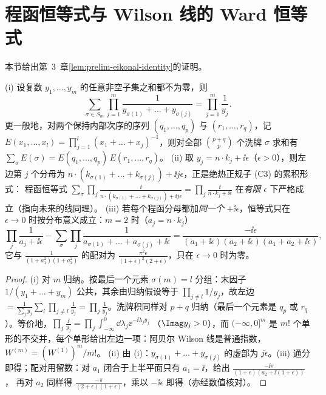 \section{程函恒等式与 Wilson 线的 Ward 恒等式}\label{sec:appB-eikonal}

本节给出第~3~章\cref{lem:prelim-eikonal-identity}的证明。

\begin{lemma}\label{lem:appB-shuffle}
(i) 设复数 $y_1,\dots,y_m$ 的任意非空子集之和都不为零，则
\begin{equation}\label{eq:appB-shuffle}
\sum_{\sigma\in S_m}\prod_{j=1}^m\frac{1}{y_{\sigma(1)}+\dots+y_{\sigma(j)}}=\prod_{j=1}^m\frac1{y_j}.
\end{equation}
更一般地，对两个保持内部次序的序列 $(q_1,\dots,q_p)$ 与 $(r_1,\dots,r_q)$，记 $E(x_1,\dots,x_l)=\prod_{j=1}^l(x_1+\dots+x_j)^{-1}$，则对全部 $\binom{p+q}{p}$ 个洗牌 $\sigma$ 求和有
$\sum_\sigma E(\sigma)=E(q_1,\dots,q_p)\,E(r_1,\dots,r_q)$。
(ii) 取 $y_j=n\cdot k_j+\ii\epsilon$（$\epsilon>0$），则左边第 $j$ 个分母为 $n\cdot(k_{\sigma(1)}+\dots+k_{\sigma(j)})+\ii j\epsilon$，正是绝热正规子 (C3) 的累积形式：
程函恒等式 $\sum_\sigma\prod_j\frac{\ii}{n\cdot(k_{\sigma(1)}+\dots+k_{\sigma(j)})+\ii j\epsilon}=\prod_j\frac{\ii}{n\cdot k_j+\ii\epsilon}$ 在\emph{有限} $\epsilon$ 下严格成立（指向未来的线同理）。
(iii) 若每个程函分母都加\emph{同一个} $+\ii\epsilon$，恒等式只在 $\epsilon\to0$ 时按分布意义成立：$m=2$ 时（$a_j=n\cdot k_j$）
\[
\prod_j\frac{1}{a_j+\ii\epsilon}-\sum_\sigma\prod_j\frac{1}{a_{\sigma(1)}+\dots+a_{\sigma(j)}+\ii\epsilon}=\frac{-\ii\epsilon}{(a_1+\ii\epsilon)(a_2+\ii\epsilon)(a_1+a_2+\ii\epsilon)},
\]
它与 $\frac1{(1+a_1^2)(1+a_2^2)}$ 的配对为 $\frac{\pi^2\epsilon}{(1+\epsilon)^2(2+\epsilon)}$，只在 $\epsilon\to0$ 时为零。
\end{lemma}

\begin{proof}
(i) 对 $m$ 归纳。按最后一个元素 $\sigma(m)=l$ 分组：末因子 $1/(y_1+\dots+y_m)$ 公共，其余由归纳假设等于 $\prod_{j\ne l}1/y_j$，故左边
$=\frac{1}{\sum_jy_j}\sum_l\prod_{j\ne l}\frac1{y_j}=\prod_j\frac1{y_j}$。洗牌积同样对 $p+q$ 归纳（最后一个元素是 $q_p$ 或 $r_q$）。等价地，$\prod_j\frac{\ii}{y_j}=\prod_j\int_{-\infty}^0\dd\lambda_j\ee^{-\ii\lambda_jy_j}$
（$\Imag y_j>0$），而 $(-\infty,0]^m$ 是 $m!$ 个单形的不交并，每个单形给出左边一项：阿贝尔 Wilson 线是普通指数，$W^{(m)}=(W^{(1)})^m/m!$。
(ii) 由 (i)：$y_{\sigma(1)}+\dots+y_{\sigma(j)}$ 的虚部为 $j\epsilon$。(iii) 通分即得；配对用留数：对 $a_1$ 闭合于上半平面只有 $a_1=\ii$，给出 $\frac{-\ii\pi}{(1+\epsilon)(a_2+\ii(1+\epsilon))}$，
再对 $a_2$ 同样得 $\frac{-\pi}{(2+\epsilon)(1+\epsilon)}$，乘以 $-\ii\epsilon$ 即得（亦经数值核对）。%
\end{proof}

